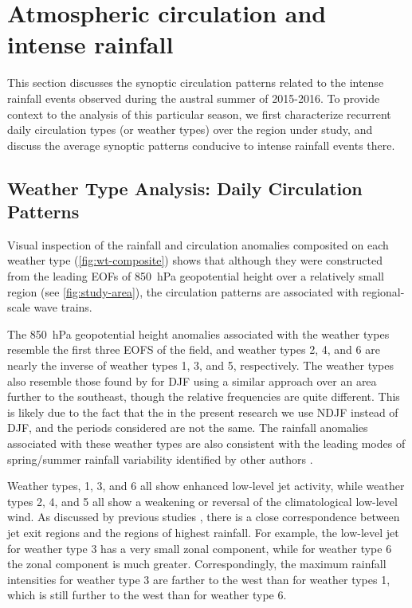 \documentclass[twocol]{ametsoc}
\begin{document}

\section{Atmospheric circulation and intense rainfall} \label{sec:diag}

This section discusses the synoptic circulation patterns related to the intense rainfall events observed during the austral summer of 2015-2016. To provide context to the analysis of this particular season, we first characterize recurrent daily circulation types (or weather types) over the region under study, and discuss the average synoptic patterns conducive to intense rainfall events there.

\subsection{Weather Type Analysis: Daily Circulation Patterns} \label{sec:weather-types}

Visual inspection of the rainfall and circulation anomalies composited on each weather type (\cref{fig:wt-composite}) shows that although they were constructed from the leading EOFs of \SI{850}{\hecto\pascal} geopotential height over a relatively small region (see \cref{fig:study-area}), the circulation patterns are associated with regional-scale wave trains.

The \SI{850}{\hecto\pascal} geopotential height anomalies associated with the weather types resemble the first three EOFS of the field, and weather types 2, 4, and 6 are nearly the inverse of weather types 1, 3, and 5, respectively.
The weather types also resemble those found by \citet{Munoz2015} for DJF using a similar approach over an area further to the southeast, though the relative frequencies are quite different.
This is likely due to the fact that the in the present research we use NDJF instead of DJF, and the periods considered are not the same.
The rainfall anomalies associated with these weather types are also consistent with the leading modes of spring/summer rainfall variability identified by other authors \citep{Grimm:2009bq}.

Weather types, 1, 3, and 6 all show enhanced low-level jet activity, while weather types 2, 4, and 5 all show a weakening or reversal of the climatological low-level wind.
As discussed by previous studies \citep{Saulo:2007km,Salio:2007gd,Marengo2004,Velasco1987}, there is a close correspondence between jet exit regions and the regions of highest rainfall.
For example, the low-level jet for weather type 3 has a very small zonal component, while for weather type 6 the zonal component is much greater.
Correspondingly, the maximum rainfall intensities for weather type 3 are farther to the west than for weather types 1, which is still further to the west than for weather type 6.
\end{document}

